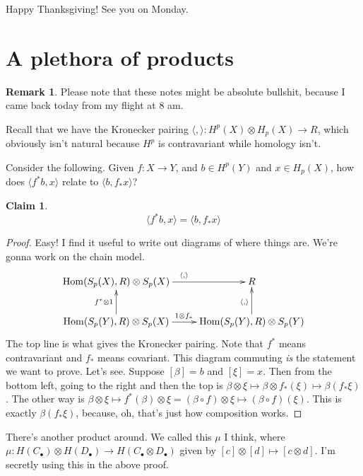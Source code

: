 \documentclass{amsart}
\theoremstyle{theorem}
\theoremstyle{definition}
\newtheorem{claim}[theorem]{Claim}
\newtheorem{remark}[theorem]{Remark}
\DeclareMathOperator{\Hom}{Hom}
\begin{document}
Happy Thanksgiving! See you on Monday.
\section{A plethora of products}
\begin{remark}
Please note that these notes might be absolute bullshit, because I came back today from my flight at 8 am.
\end{remark}
Recall that we have the Kronecker pairing $\langle ,\rangle: H^p(X)\otimes H_p(X)\to R$, which obviously isn't natural because $ H^p$ is contravariant while homology isn't.

Consider the following. Given $f:X\to Y$, and $b\in H^p(Y)$ and $x\in H_p(X)$, how does $\langle f^\ast b,x\rangle$ relate to $\langle b,f_\ast x\rangle$?
\begin{claim}
$$\langle f^\ast b,x\rangle=\langle b,f_\ast x\rangle$$
\end{claim}
\begin{proof}
Easy! I find it useful to write out diagrams of where things are. We're gonna work on the chain model.
\begin{equation*}
	\xymatrix{
	\Hom(S_p(X),R)\otimes S_p(X)\ar[r]^{\langle,\rangle} & R\\
	\Hom(S_p(Y),R)\otimes S_p(X)\ar[r]^{1\otimes f_\ast}\ar[u]^{f^\ast\otimes 1} & \Hom(S_p(Y),R)\otimes S_p(Y)\ar[u]^{\langle,\rangle}
	}
\end{equation*}
The top line is what gives the Kronecker pairing. Note that $f^\ast$ means contravariant and $f_\ast$ means covariant. This diagram commuting \emph{is} the statement we want to prove. Let's see. Suppose $[\beta]=b$ and $[\xi]=x$. Then from the bottom left, going to the right and then the top is $\beta\otimes\xi\mapsto\beta\otimes f_\ast(\xi)\mapsto\beta(f_\ast\xi)$. The other way is $\beta\otimes\xi\mapsto f^\ast(\beta)\otimes\xi=(\beta\circ f)\otimes\xi\mapsto(\beta\circ f)(\xi)$. This is exactly $\beta(f_\ast\xi)$, because, oh, that's just how composition works.
\end{proof}
There's another product around. We called this $\mu$ I think, where $\mu:H(C_\bullet)\otimes H(D_\bullet)\to H(C_\bullet\otimes D_\bullet)$ given by $[c]\otimes [d]\mapsto[c\otimes d]$. I'm secretly using this in the above proof.
\end{document}

